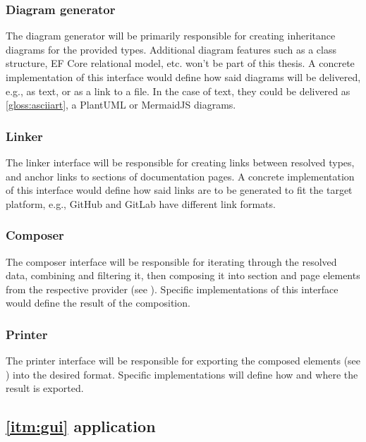 \subsubsection{Diagram generator}

The diagram generator will be primarily responsible for creating inheritance diagrams for the provided types. Additional diagram features such as a class structure, EF Core relational model, etc. won't be part of this thesis.
A concrete implementation of this interface would define how said diagrams will be delivered, e.g., as text, or as a link to a file.
In the case of text, they could be delivered as \ref{gloss:asciiart}, a PlantUML or MermaidJS diagrams.

\subsubsection{Linker}

The linker interface will be responsible for creating links between resolved types, and anchor links to sections of documentation pages.
A concrete implementation of this interface would define how said links are to be generated to fit the target platform, e.g., GitHub and GitLab have different link formats.

\subsubsection{Composer} \label{sec:composer}

The composer interface will be responsible for iterating through the resolved data, combining and filtering it, then composing it into section and page elements from the respective provider (see ).
Specific implementations of this interface would define the result of the composition.

\subsubsection{Printer}

The printer interface will be responsible for exporting the composed elements (see ) into the desired format.
Specific implementations will define how and where the result is exported.

\subsection{\ref{itm:gui} application}

